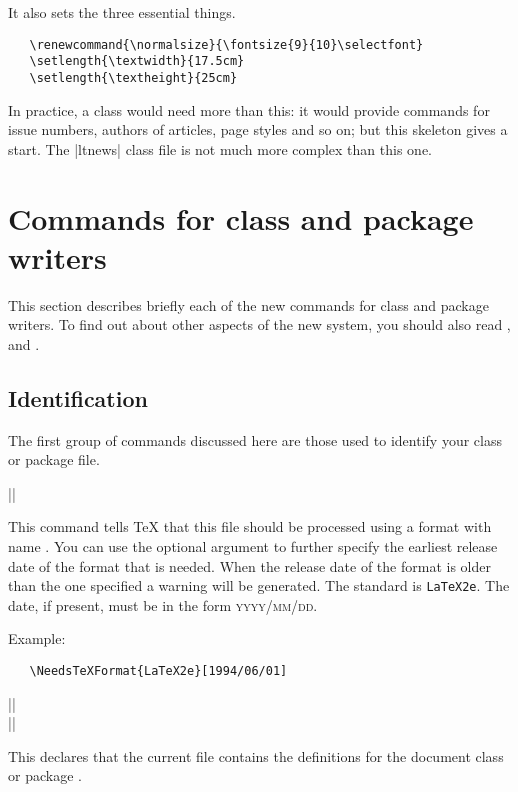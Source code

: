 \documentclass[11pt]{ltxguide}[1995/11/28]
\begin{document}
It also sets the three essential things.
\begin{verbatim}
   \renewcommand{\normalsize}{\fontsize{9}{10}\selectfont}
   \setlength{\textwidth}{17.5cm}
   \setlength{\textheight}{25cm}
\end{verbatim}
In practice, a class would need more than this: it would provide
commands for issue numbers, authors of articles, page styles and so
on; but this skeleton gives a start.  The |ltnews| class file is not
much more complex than this one.

\section{Commands for class and package writers}
\label{Sec:commands}

This section describes briefly each of the new commands for class and
package writers.  To find out about other aspects of the new system,
you should also read \emph{\LaTeXbook}, \emph{\LaTeXcomp} and
\emph{\usrguide}.

\subsection{Identification}

The first group of commands discussed here are those used
to identify your class or package file.

\begin{decl}
|\NeedsTeXFormat|  
\end{decl}
This command tells \TeX{} that this file should be processed using a
format with name .  You can use the optional argument
 to further specify the earliest release date of the
format that is needed.  When the release date of the format is older
than the one specified a warning will be generated. The standard
 is \texttt{LaTeX2e}.  The date, if present, must be in
the form \textsc{yyyy/mm/dd}.

Example:
\begin{verbatim}
   \NeedsTeXFormat{LaTeX2e}[1994/06/01]
\end{verbatim}

\begin{decl}
|\ProvidesClass|   \\
|\ProvidesPackage|  
\end{decl}
This declares that the current file contains the definitions for the
document class  or package .
\end{document}
